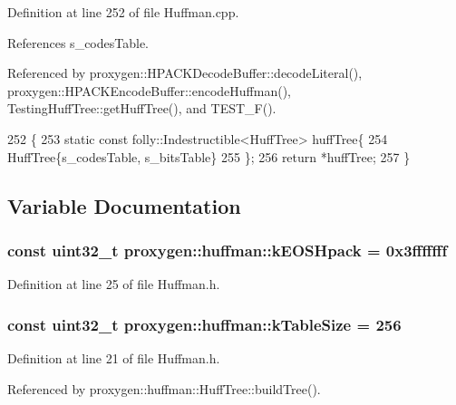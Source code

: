 Definition at line 252 of file Huffman.\+cpp.



References s\+\_\+codes\+Table.



Referenced by proxygen\+::\+H\+P\+A\+C\+K\+Decode\+Buffer\+::decode\+Literal(), proxygen\+::\+H\+P\+A\+C\+K\+Encode\+Buffer\+::encode\+Huffman(), Testing\+Huff\+Tree\+::get\+Huff\+Tree(), and T\+E\+S\+T\+\_\+\+F().


\begin{DoxyCode}
252                            \{
253   \textcolor{keyword}{static} \textcolor{keyword}{const} folly::Indestructible<HuffTree> huffTree\{
254     HuffTree\{s_codesTable, s_bitsTable\}
255   \};
256   \textcolor{keywordflow}{return} *huffTree;
257 \}
\end{DoxyCode}


\subsection{Variable Documentation}
\subsubsection[{k\+E\+O\+S\+Hpack}]{\setlength{\rightskip}{0pt plus 5cm}const uint32\+\_\+t proxygen\+::huffman\+::k\+E\+O\+S\+Hpack = 0x3fffffff}\label{namespaceproxygen_1_1huffman_a5065a19207f0263838f4ccfb572001c5}


Definition at line 25 of file Huffman.\+h.

\subsubsection[{k\+Table\+Size}]{\setlength{\rightskip}{0pt plus 5cm}const uint32\+\_\+t proxygen\+::huffman\+::k\+Table\+Size = 256}\label{namespaceproxygen_1_1huffman_a7f164f649bced947bd9644ab48000269}


Definition at line 21 of file Huffman.\+h.



Referenced by proxygen\+::huffman\+::\+Huff\+Tree\+::build\+Tree().


